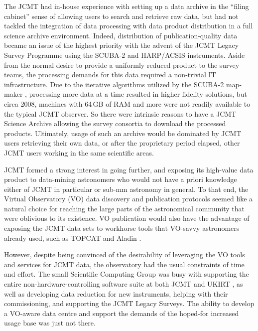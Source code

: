 \documentclass[final,authoryear,5p,times,twocolumn]{elsarticle}
\begin{document}
The JCMT had in-house experience with setting up a data archive in the
``filing cabinet'' sense of allowing users to search and retrieve raw
data, but had not tackled the integration of data processing with data
product distribution in a full science archive environment.
Indeed, distribution of publication-quality data became an issue of
the highest priority with the advent of the JCMT Legacy Survey
Programme \citep{2010HiA....15..797C,2008ASPC..394..450E} using the
SCUBA-2 and HARP/ACSIS \citep{2009MNRAS.399.1026B} instruments. Aside
from the normal desire to provide a uniformly reduced product to the
survey teams, the processing demands for this data required a
non-trivial IT infrastructure. Due to the iterative algorithms
utilized by the SCUBA-2 map-maker
\citep[SMURF;][]{2013MNRAS.430.2545C}, processing more data at a time  resulted in higher fidelity solutions, but circa 2008,
machines with 64\,GB of RAM and more were not readily
available to the typical JCMT observer. So there were intrinsic
reasons to have a JCMT Science Archive allowing the survey consortia
to download the processed products. Ultimately, usage of such an
archive would be dominated by JCMT users retrieving their own data, or
after the proprietary period elapsed, other JCMT users working in the
same scientific areas.

JCMT formed a strong interest in going further, and exposing its
high-value data product to data-mining astronomers who would not have
a priori knowledge either of JCMT in particular or sub-mm astronomy in
general. To that end, the Virtual Observatory (VO) data discovery and publication protocols
seemed like a natural choice for reaching the large parts of the
astronomical community that were oblivious to its existence. VO
publication would also have the advantage of exposing the JCMT data
sets to workhorse tools that VO-savvy astronomers already used, such
as TOPCAT \citep[][]{2005ASPC..347...29T} and Aladin
\citep[][]{2005ASPC..347..193O}.

However, despite being convinced of the desirability of
leveraging the VO tools and services for JCMT data, the observatory
had the usual constraints of time and effort. The small Scientific
Computing Group was busy with supporting the entire non-hardware-controlling
software suite at both JCMT and UKIRT \citep[see e.g.,][with both
telescopes operated by the same organization]{2002SPIE.4844..321E,2011tfa..confE..42J},
as well as developing data reduction for new instruments, helping with
their commissioning,
and supporting the JCMT Legacy Surveys. The ability to develop a
VO-aware data centre and support the demands of the hoped-for
increased usage base was just not there.
\end{document}
